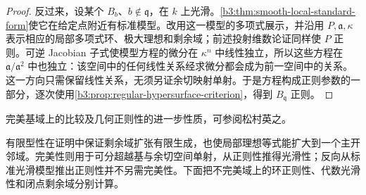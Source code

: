 \begin{proof}
	反过来，设某个 \(B_b\)、\(b\notin\mathfrak q\)，在 \(k\) 上光滑。\cref{b3:thm:smooth-local-standard-form}使它在给定点附近有标准模型。改用这一模型的多项式展示，并沿用 \(P,\mathfrak a,\kappa\) 表示相应的局部多项式环、极大理想和剩余域；前述投射维数论证同样使 \(P\) 正则。可逆 Jacobian 子式使模型方程的微分在 \(\kappa^n\) 中线性独立，所以这些方程在 \(\mathfrak a/\mathfrak a^2\) 中也独立：该空间中的任何线性关系经求微分都会成为前一空间中的关系。这一方向只需保留线性关系，无须另证余切映射单射。于是方程构成正则参数的一部分，逐次使用\cref{b3:prop:regular-hypersurface-criterion}，得到 \(B_{\mathfrak q}\) 正则。
\end{proof}

完美基域上的比较及几何正则性的进一步性质，可参阅松村英之\cite[Theorem 28.7, pp. 219--220; Theorem 30.3 and Remark 2, pp. 233--235]{Matsumura1989CommutativeRingTheory}。

\ProseParagraphBreak
有限型性在证明中保证剩余域扩张有限生成，也使局部理想等式能扩大到一个主开邻域。完美性则用于可分超越基与余切空间单射，从正则性推得光滑性；反向从标准光滑模型推出正则性并不另需完美性。下面把不完美域上的环正则性、代数光滑性和闭点剩余域分别计算。

